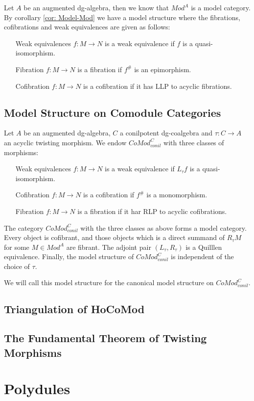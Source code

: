 \documentclass[../thesis.tex]{subfiles}
\begin{document}
            Let $A$ be an augmented dg-algebra, then we know that $Mod^A$ is a model category. By corollary \ref{cor: Model-Mod} we have a model structure where the fibrations, cofibrations and weak equivalences are given as follows:
            \begin{itemize}
                \item[Weak equivalences] $f: M \rightarrow N$ is a weak equivalence if $f$ is a quasi-isomorphism.
                \item[Fibration] $f : M\rightarrow N$ is a fibration if $f^\#$ is an epimorphism.
                \item[Cofibration] $f : M\rightarrow N$ is a cofibration if it has LLP to acyclic fibrations. 
            \end{itemize}

        \subsection{Model Structure on Comodule Categories}

            Let $A$ be an augmented dg-algebra, $C$ a conilpotent dg-coalgebra and $\tau : C \rightarrow A$ an acyclic twisting morphism. We endow $CoMod^C_{conil}$ with three classes of morphisms:
            \begin{itemize}
                \item[Weak equivalences] $f : M \rightarrow N$ is a weak equivalence if $L_\tau f$ is a quasi-isomorphism.
                \item[Cofibration] $f : M \rightarrow N$ is a cofibration if $f^\#$ is a monomorphism.
                \item[Fibration] $f : M \rightarrow N$ is a fibration if it har RLP to acyclic cofibrations.
            \end{itemize}

            \begin{thm}
              The category $CoMod^C_{conil}$ with the three classes as above forms a model category. Every object is cofibrant, and those objects which is a direct summand of $R_\tau M$ for some $M\in Mod^A$ are fibrant. The adjoint pair $(L_\tau, R_\tau)$ is a Quilllen equivalence. Finally, the model structure of $CoMod^C_{conil}$ is independent of the choice of $\tau$.
            \end{thm}

            We will call this model structure for the canonical model structure on $CoMod^C_{conil}$.

        \subsection{Triangulation of HoCoMod}

        \subsection{The Fundamental Theorem of Twisting Morphisms}

    \section{Polydules}
\end{document}
